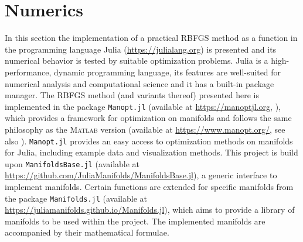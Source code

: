 \chapter{Numerics}

In this section the implementation of a practical RBFGS method as a function in the programming language Julia (\url{https://julialang.org}) is presented and its numerical behavior is tested by suitable optimization problems. Julia is a high-performance, dynamic programming language, its features are well-suited for numerical analysis and computational science and it has a built-in package manager. The RBFGS method (and variants thereof) presented here is implemented in the package \lstinline!Manopt.jl! (available at \url{https://manoptjl.org}, \cite{Bergmann:2019}), which provides a framework for optimization on manifolds and follows the same philosophy as the \textsc{Matlab} version (available at \url{https://www.manopt.org/}, see also \cite{BoumalMishraAbsilSepulchre:2014}). \lstinline!Manopt.jl! provides an easy access to optimization methods on manifolds for Julia, including example data and visualization methods. This project is build upon \lstinline!ManifoldsBase.jl! (available at \url{https://github.com/JuliaManifolds/ManifoldsBase.jl}), a generic interface to implement manifolds. Certain functions are extended for specific manifolds from the package \lstinline!Manifolds.jl! (available at \url{https://juliamanifolds.github.io/Manifolds.jl}), which aims to provide a library of manifolds to be used within the project. The implemented manifolds are accompanied by their mathematical formulae. \\

